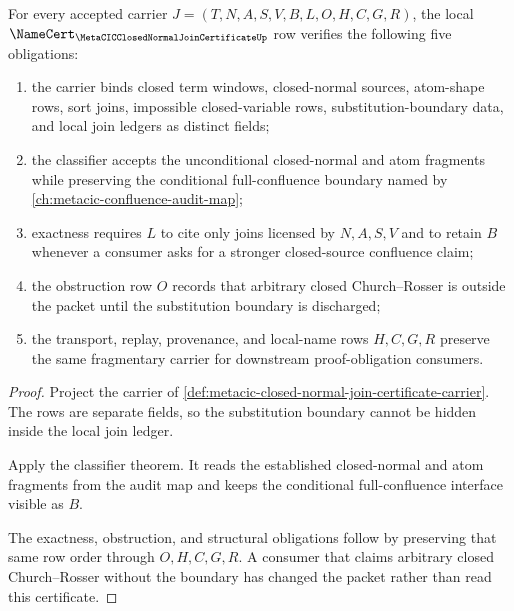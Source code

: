 \begin{theorem}
\label{thm:metacic-closed-normal-join-certificate-namecert-obligations}
For every accepted carrier $J=(T,N,A,S,V,B,L,O,H,C,G,R)$, the local $\NameCert_{\MetaCICClosedNormalJoinCertificateUp}$ row verifies the following five obligations:
\begin{enumerate}
\item the carrier binds closed term windows, closed-normal sources, atom-shape rows, sort joins, impossible closed-variable rows, substitution-boundary data, and local join ledgers as distinct fields;
\item the classifier accepts the unconditional closed-normal and atom fragments while preserving the conditional full-confluence boundary named by \autoref{ch:metacic-confluence-audit-map};
\item exactness requires $L$ to cite only joins licensed by $N,A,S,V$ and to retain $B$ whenever a consumer asks for a stronger closed-source confluence claim;
\item the obstruction row $O$ records that arbitrary closed Church--Rosser is outside the packet until the substitution boundary is discharged;
\item the transport, replay, provenance, and local-name rows $H,C,G,R$ preserve the same fragmentary carrier for downstream proof-obligation consumers.
\end{enumerate}
\end{theorem}
\begin{proof}
Project the carrier of \autoref{def:metacic-closed-normal-join-certificate-carrier}. The rows are separate fields, so the substitution boundary cannot be hidden inside the local join ledger.

Apply the classifier theorem. It reads the established closed-normal and atom fragments from the audit map and keeps the conditional full-confluence interface visible as $B$.

The exactness, obstruction, and structural obligations follow by preserving that same row order through $O,H,C,G,R$. A consumer that claims arbitrary closed Church--Rosser without the boundary has changed the packet rather than read this certificate.
\end{proof}

